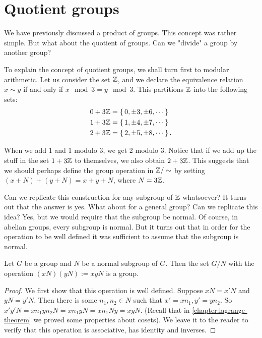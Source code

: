 \documentclass[./main.tex]{subfiles}
\begin{document}
\section{Quotient groups}
We have previously discussed a product of groups. This concept was rather
simple. But what about the quotient of groups. Can we "divide" a group by
another group? 

To explain the concept of quotient groups, we shall turn first to modular
arithmetic. Let us consider the set $\mathbb{Z}$, and we declare the equivalence
relation $x \sim y$ if and only if $x \mod 3 = y \mod 3$. This partitions $\mathbb{Z}$
into the following sets:
\begin{align*}
    0 + 3\mathbb{Z} &= \set{0, \pm3, \pm6, \cdots} \\
    1 + 3\mathbb{Z} &= \set{1, \pm4, \pm7, \cdots} \\
    2 + 3\mathbb{Z} &= \set{2, \pm5, \pm8, \cdots}.
\end{align*}

When we add 1 and 1 modulo 3, we get 2 modulo 3. Notice that if we add up the
stuff in the set $1 + 3\mathbb{Z}$ to themselves, we also obtain $2 + 3\mathbb{Z}$. This
suggests that we should perhaps define the group operation in $\mathbb{Z} / \sim$ by
setting $(x + N) + (y + N) = x + y + N$, where $N = 3 \mathbb{Z}$. 

Can we replicate this construction for any subgroup of $\mathbb{Z}$ whatsoever? It
turns out that the answer is yes. What about for a general group? Can we
replicate this idea? Yes, but we would require that the subgroup be normal.  Of
course, in abelian groups, every subgroup is normal. But it turns out that in
order for the operation to be well defined it was sufficient to assume that the
subgroup is normal. 
\begin{theorem}
\label{thm:existence-of-quotient-groups}
    Let $G$ be a group and $N$ be a normal subgroup of $G$. Then the set $G/N$
    with the operation $(xN)(yN) := xyN$ is a group.
\end{theorem}
\begin{proof}
    We first show that this operation is well defined. Suppose $xN = x'N$ and
    $yN = y'N$. Then there is some $n_1, n_2 \in N$ such that $x' = x n_1, y' =
    yn_2$. So $x'y'N = x n_1 y n_2 N = x n_1 y N = x n_1 N y = xyN$. (Recall
    that in \cref{chapter:lagrange-theorem} we proved some properties about
    cosets). We leave it to the reader to verify that this operation is
    associative, has identity and inverses.
\end{proof}
\end{document}
